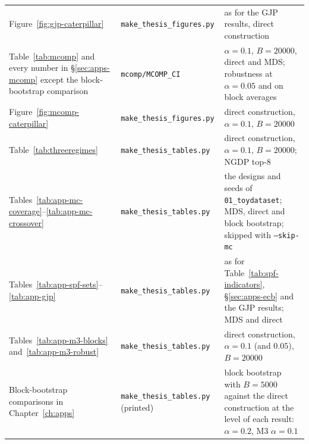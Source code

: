 \begin{table}[htb]
\begin{tabular}{p{4.2cm}p{4.6cm}p{5.0cm}}
    Figure~\ref{fig:gjp-caterpillar}
      & \texttt{make\_thesis\_figures.py}
      & as for the GJP results, direct construction\\
    Table~\ref{tab:mcomp} and every number in \S\ref{sec:apps-mcomp} except the
    block-bootstrap comparison
      & \texttt{mcomp/MCOMP\_CI}
      & $\alpha=0.1$, $B=20000$, direct and MDS; robustness at $\alpha=0.05$ and on
        block averages\\
    Figure~\ref{fig:mcomp-caterpillar}
      & \texttt{make\_thesis\_figures.py}
      & direct construction, $\alpha=0.1$, $B=20000$\\
    Table~\ref{tab:threeregimes}
      & \texttt{make\_thesis\_tables.py}
      & direct construction, $\alpha=0.1$, $B=20000$; NGDP top-8\\
    Tables~\ref{tab:app-mc-coverage}--\ref{tab:app-mc-crossover}
      & \texttt{make\_thesis\_tables.py}
      & the designs and seeds of \texttt{01\_toydataset}; MDS, direct and block
        bootstrap; skipped with \texttt{--skip-mc}\\
    Tables~\ref{tab:app-spf-sets}--\ref{tab:app-gjp}
      & \texttt{make\_thesis\_tables.py}
      & as for Table~\ref{tab:spf-indicators}, \S\ref{sec:apps-ecb} and the GJP
        results; MDS and direct\\
    Tables~\ref{tab:app-m3-blocks} and~\ref{tab:app-m3-robust}
      & \texttt{make\_thesis\_tables.py}
      & direct construction, $\alpha=0.1$ (and $0.05$), $B=20000$\\
    Block-bootstrap comparisons in Chapter~\ref{ch:apps}
      & \texttt{make\_thesis\_tables.py} (printed)
      & block bootstrap with $B=5000$ against the direct construction at the level
        of each result: $\alpha=0.2$, M3 $\alpha=0.1$\\
    \bottomrule
  \end{tabular}
\end{table}
